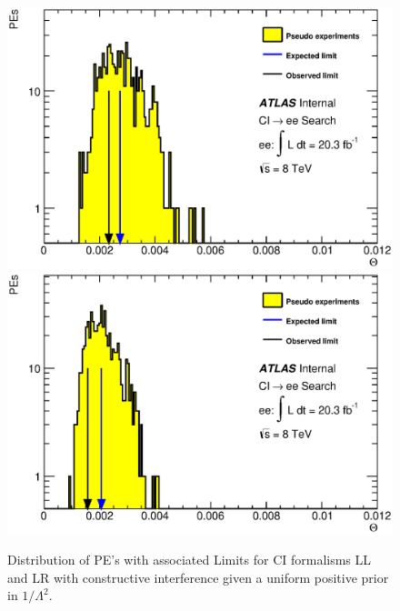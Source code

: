     \begin{figure}[h]
        \begin{center}
            \includegraphics[scale=0.4]{images/ee__LL_minus_L2/Theta.eps}
            \includegraphics[scale=0.4]{images/ee__LR_minus_L2/Theta.eps}
        \end{center}
       \caption{Distribution of PE's with associated Limits for CI formalisms LL and LR with constructive interference given a uniform positive prior in $1/\Lambda^{2}$.}
       \label{fig:Theta_CI_main}
    \end{figure}




